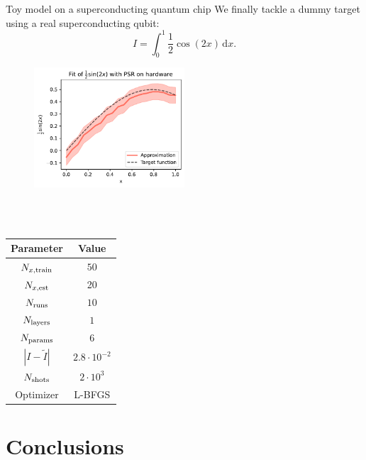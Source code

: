 \documentclass[8pt, xcolor={svgnames}, hyperref={linkcolor=black}]{beamer}
\begin{document}
\begin{frame}{Toy model on a superconducting quantum chip}
We finally tackle a dummy target using a real superconducting qubit:
\begin{equation}
I = \int_{0}^{1} \frac{1}{2} \cos(2x)\, \text{d}x.
\end{equation}
\pause
\begin{multicols}{2}
\begin{figure}  
\centering
    \includegraphics[width=0.5\textwidth]{figures/hardware.pdf}
\end{figure}

\texttt{\\}
\texttt{\\}

\begin{table}
\footnotesize
\begin{tabular}{cc}
\hline \hline
\textbf{Parameter} & \textbf{Value} \\
\hline
$N_{x, \rm train}$ & $50$ \\
$N_{x, \rm est}$ & 20 \\
$N_{\rm runs}$ & $10$ \\
$N_{\rm layers}$ & $1$ \\
$N_{\rm params}$ & $6$ \\ 
$|I - \tilde{I}|$ & $2.8 \cdot 10^{-2}$ \\
$N_{\rm shots}$ & $2\cdot10^{3}$ \\
Optimizer & L-BFGS \\
\hline \hline 
\end{tabular}
\end{table}

\end{multicols}
\end{frame}

\section{Conclusions}
\end{document}
